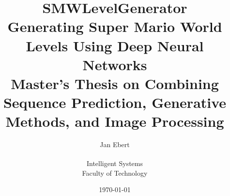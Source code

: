 \documentclass[12pt,a4paper,titlepage]{article} %
\title{SMWLevelGenerator \\
  \Large{Generating Super Mario World Levels Using Deep Neural Networks} \\
  \bigskip
  \large{Master's Thesis on Combining Sequence Prediction,
    Generative Methods, and Image Processing}}
\author{Jan Ebert \smallskip \\ \\
  \small{Intelligent Systems} \\
  \small{Faculty of Technology}}
\date{\today}
\begin{document}








\raggedright
\printbibliography
\end{document}
